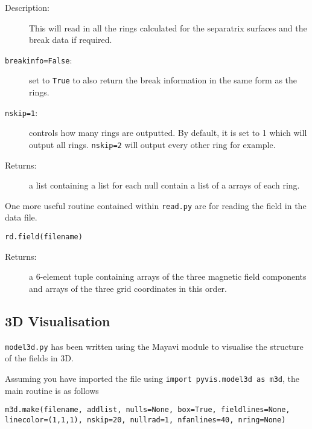 \documentclass[12pt]{article}
\begin{document}
      \begin{description}
        \item [Description:] This will read in all the rings calculated for the separatrix surfaces and the break data if required.
        \item [\texttt{breakinfo=False}:] set to \texttt{True} to also return the break information in the same form as the rings.
        \item [\texttt{nskip=1}:] controls how many rings are outputted. By default, it is set to 1 which will output all rings. \texttt{nskip=2} will output every other ring for example.
        \item [Returns:] a list containing a list for each null contain a list of a arrays of each ring.
      \end{description}

      One more useful routine contained within \texttt{read.py} are for reading the field in the data file.

      \texttt{rd.field(filename)}

      \begin{description}
        \item [Returns:] a 6-element tuple containing arrays of the three magnetic field components and arrays of the three grid coordinates in this order.
      \end{description}

    \subsection{3D Visualisation}

      \texttt{model3d.py} has been written using the Mayavi module to visualise the structure of the fields in 3D.

      Assuming you have imported the file using \texttt{import pyvis.model3d as m3d}, the main routine is as follows
      
      \texttt{m3d.make(filename, addlist, nulls=None, box=True, fieldlines=None, linecolor=(1,1,1), nskip=20, nullrad=1, nfanlines=40, nring=None)}
\end{document}
